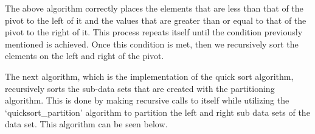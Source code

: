 \documentclass[a4paper,9pt]{article}
\begin{document}
\begin{highlight}
    \noindent The above algorithm correctly places the elements that are less than that of the pivot to the left of it and the values that are greater than or equal to that of the pivot
    to the right of it. This process repeats itself until the condition previously mentioned is achieved. Once this condition is met, then we recursively sort the elements on the left and right of the pivot.

\end{highlight}

The next algorithm, which is the implementation of the quick sort algorithm, recursively sorts the sub-data sets that are created with the partitioning algorithm. This is done
by making recursive calls to itself while utilizing the `quicksort\_partition' algorithm to partition the left and right sub data sets of the data set. This algorithm can be seen below.
\end{document}
